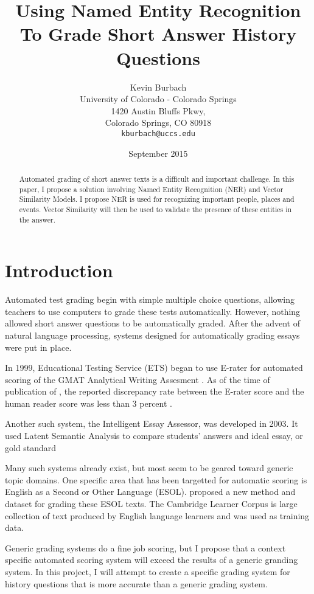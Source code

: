 \documentclass{sig-alternate}
\begin{document}
\title{Using Named Entity Recognition To Grade Short Answer History Questions}
\author{Kevin Burbach\\
        University of Colorado - Colorado Springs\\
        1420 Austin Bluffs Pkwy,\\
        Colorado Springs, CO 80918\\
        \texttt{kburbach@uccs.edu}
       }
\date{September 2015}

\maketitle

\begin{abstract}
   Automated grading of short answer texts is a difficult and important challenge. In this paper, I propose a solution involving Named Entity Recognition (NER) and Vector Similarity Models. I propose NER is used for recognizing important people, places and events. Vector Similarity will then be used to validate the presence of these entities in the answer.
\end{abstract}

\section{Introduction}
Automated test grading begin with simple multiple choice questions, allowing teachers to use computers to grade these tests automatically. However, nothing allowed short answer questions to be automatically graded. After the advent of natural language processing, systems designed for automatically grading essays were put in place.

In 1999, Educational Testing Service (ETS) began to use E-rater for automated scoring of the GMAT Analytical Writing Assesment \cite{recognizing_named_entities_in_tweets}. As of the time of publication of \cite{burstein_pdf}, the reported discrepancy rate between the E-rater score and the human reader score was less than 3 percent \cite{burstein_pdf}. 

Another such system, the Intelligent Essay Assessor, was developed in 2003. It used Latent Semantic Analysis to compare students' answers and ideal essay, or gold standard \cite{auto_marking}

Many such systems already exist, but most seem to be geared toward generic topic domains. One specific area that has been targetted for automatic scoring is English as a Second or Other Language (ESOL). \cite{ESOL} proposed a new method and dataset for grading these ESOL texts. The Cambridge Learner Corpus \cite{ESOL} is large collection of text produced by English language learners and was used as training data. 

Generic grading systems do a fine job scoring, but I propose that a context specific automated scoring system will exceed the results of a generic granding system. In this project, I will attempt to create a specific grading system for history questions that is more accurate than a generic grading system.




{}

\end{document}
